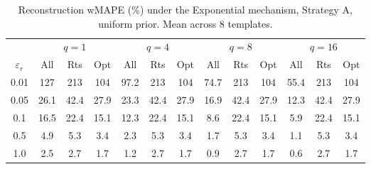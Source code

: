 \begin{table}[h]
\centering
\setlength{\tabcolsep}{2.5pt}
\small
\caption{Reconstruction wMAPE (\%) under the Exponential mechanism, Strategy A, uniform prior. Mean across 8 templates.}
\label{tab:rq2_exp_A_uniform}
\begin{tabular}{c|ccc|ccc|ccc|ccc}
\toprule
 & \multicolumn{3}{c|}{$q=1$} & \multicolumn{3}{c|}{$q=4$} & \multicolumn{3}{c|}{$q=8$} & \multicolumn{3}{c}{$q=16$} \\
$\varepsilon_r$ & All & Rts & Opt & All & Rts & Opt & All & Rts & Opt & All & Rts & Opt \\
\midrule
0.01 & 127 & 213 & 104 & 97.2 & 213 & 104 & 74.7 & 213 & 104 & 55.4 & 213 & 104 \\
0.05 & 26.1 & 42.4 & 27.9 & 23.3 & 42.4 & 27.9 & 16.9 & 42.4 & 27.9 & 12.3 & 42.4 & 27.9 \\
0.1 & 16.5 & 22.4 & 15.1 & 12.3 & 22.4 & 15.1 & 8.6 & 22.4 & 15.1 & 5.9 & 22.4 & 15.1 \\
0.5 & 4.9 & 5.3 & 3.4 & 2.3 & 5.3 & 3.4 & 1.7 & 5.3 & 3.4 & 1.1 & 5.3 & 3.4 \\
1.0 & 2.5 & 2.7 & 1.7 & 1.2 & 2.7 & 1.7 & 0.9 & 2.7 & 1.7 & 0.6 & 2.7 & 1.7 \\
\bottomrule
\end{tabular}
\end{table}
